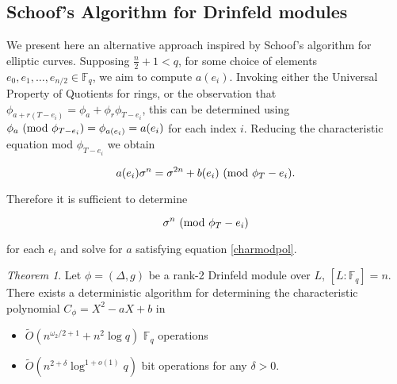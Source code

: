 \documentclass{acmart}
\theoremstyle{remark}
\numberwithin{equation}{section}
\newtheorem{theorem}{Theorem}
\begin{document}
\subsection{Schoof's Algorithm for Drinfeld modules}

We present here an alternative approach inspired by Schoof's algorithm for elliptic curves. Supposing $ \frac{n}{2} + 1 < q$, for some choice of elements $e_0, e_1, \ldots, e_{n/2} \in \mathbb{F}_q$, we aim to compute $a(e_i)$. Invoking either the Universal Property of Quotients for rings, or the observation that $\phi_{a + r(T-e_i)} = \phi_a + \phi_{r} \phi_{T- e_i}$, this can be determined using $\phi_a \textnormal{ (mod } \phi_{T - e_i} \textnormal{)} = \phi_{a(e_i)} = a(e_i)$ for each index $i$. Reducing the characteristic equation mod $\phi_{T- e_i}$ we obtain

\begin{equation}\label{charmodpol}
 a(e_i) \sigma^n  = \sigma^{2n} + b(e_i) \textnormal{ (mod } \phi_{T} - e_i \textnormal{)}.
 \end{equation}

\noindent Therefore it is sufficient to determine

\[\sigma^{n} \textnormal{ (mod } \phi_{T} - e_i \textnormal{)} \]

\noindent for each $e_i$ and solve for $a$ satisfying equation \ref{charmodpol}. 

\begin{theorem}

Let $\phi = (\Delta, g)$ be a rank-2 Drinfeld module over $L$, $[L: \mathbb{F}_q] = n$. There exists a deterministic algorithm for determining the characteristic polynomial $C_{\phi} = X^2 -aX + b$ in
\begin{itemize}
\item $\widetilde{O}(n^{\omega_2/2 + 1} + n^2 \log q)$ $\mathbb{F}_q$ operations

\item $\widetilde{O}(n^{2+\delta} \log^{1 + o(1)} q)$ bit operations for any $\delta > 0$.
\end{itemize}

\end{theorem}
\end{document}
